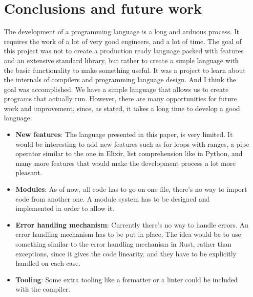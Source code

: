 ﻿\documentclass[10pt,a4paper,twocolumn,twoside]{article}
\begin{document}
\section{Conclusions and future work}
The development of a programming language is a long and arduous process. It
requires the work of a lot of very good engineers, and a lot of time. The goal
of this project was not to create a production ready language packed with
features and an extensive standard library, but rather to create a simple
language with the basic functionality to make something useful. It was a project
to learn about the internals of compilers and programming language design. And I
think the goal was accomplished. We have a simple language that allows us to
create programs that actually run. However, there are many opportunities for
future work and improvement, since, as stated, it takes a long time to develop a
good language:

\begin{itemize}
    \item \textbf{New features}: The language presented in this paper, is very
        limited. It would be interesting to add new features such as for loops
        with ranges, a pipe operator similar to the one in Elixir, list 
        comprehension like in Python, and many more features that would make 
        the development process a lot more pleasant.
    \item \textbf{Modules}: As of now, all code has to go on one file, there's
        no way to import code from another one. A module system has to be 
        designed and implemented in order to allow it.
    \item \textbf{Error handling mechanism}: Currently there's no way to handle
        errors. An error handling mechanism has to be put in place. The idea
        would be to use something similar to the error handling mechanism in 
        Rust, rather than exceptions, since it gives the code linearity, and 
        they have to be explicitly handled on each case.
    \item \textbf{Tooling}: Some extra tooling like a formatter or a linter
        could be included with the compiler.
\end{itemize}
\end{document}
